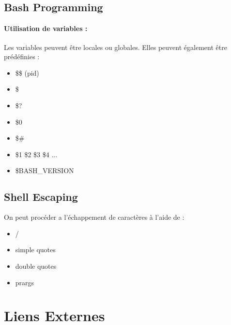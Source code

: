 \documentclass{article}[12pt]
\begin{document}
\subsection{ Bash Programming}
\paragraph{Utilisation de variables : } Les variables peuvent être locales ou globales. Elles peuvent également être prédéfinies : 
\begin{itemize}
\item \$\$ (pid)
\item \$\*
\item \$?
\item \$0
\item \$\#
\item \$1 \$2 \$3 \$4 ...
\item \$BASH\_VERSION
\end{itemize}
\subsection{ Shell Escaping}
On peut procéder a l’échappement de caractères à l'aide de : 
\begin{itemize}
\item /
\item simple quotes
\item double quotes
\item prargs
\end{itemize}
\section{Liens Externes}
\end{document}
